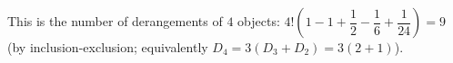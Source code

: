 This is the number of derangements of $4$ objects: $4!\left(1-1+\dfrac12-\dfrac16+\dfrac1{24}\right)=\boxed{9}$ (by inclusion-exclusion; equivalently $D_4=3(D_3+D_2)=3(2+1)$).
